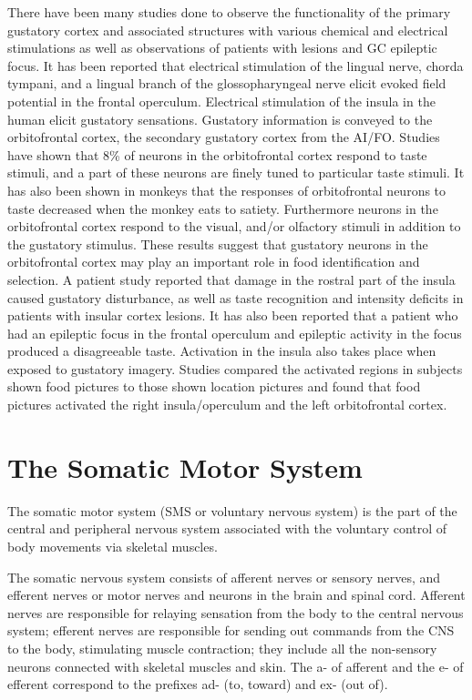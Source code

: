\documentclass[]{book}
\begin{document}
There have been many studies done to observe the functionality of the primary gustatory cortex and associated structures with various chemical and electrical stimulations as well as observations of patients with lesions and GC epileptic focus. It has been reported that electrical stimulation of the lingual nerve, chorda tympani, and a lingual branch of the glossopharyngeal nerve elicit evoked field potential in the frontal operculum. Electrical stimulation of the insula in the human elicit gustatory sensations. Gustatory information is conveyed to the orbitofrontal cortex, the secondary gustatory cortex from the AI/FO. Studies have shown that 8\% of neurons in the orbitofrontal cortex respond to taste stimuli, and a part of these neurons are finely tuned to particular taste stimuli. It has also been shown in monkeys that the responses of orbitofrontal neurons to taste decreased when the monkey eats to satiety. Furthermore neurons in the orbitofrontal cortex respond to the visual, and/or olfactory stimuli in addition to the gustatory stimulus. These results suggest that gustatory neurons in the orbitofrontal cortex may play an important role in food identification and selection. A patient study reported that damage in the rostral part of the insula caused gustatory disturbance, as well as taste recognition and intensity deficits in patients with insular cortex lesions. It has also been reported that a patient who had an epileptic focus in the frontal operculum and epileptic activity in the focus produced a disagreeable taste. Activation in the insula also takes place when exposed to gustatory imagery. Studies compared the activated regions in subjects shown food pictures to those shown location pictures and found that food pictures activated the right insula/operculum and the left orbitofrontal cortex.

\hypertarget{the-somatic-motor-system}{%
\chapter{The Somatic Motor System}\label{the-somatic-motor-system}}

The somatic motor system (SMS or voluntary nervous system) is the part of the central and peripheral nervous system associated with the voluntary control of body movements via skeletal muscles.

The somatic nervous system consists of afferent nerves or sensory nerves, and efferent nerves or motor nerves and neurons in the brain and spinal cord. Afferent nerves are responsible for relaying sensation from the body to the central nervous system; efferent nerves are responsible for sending out commands from the CNS to the body, stimulating muscle contraction; they include all the non-sensory neurons connected with skeletal muscles and skin. The a- of afferent and the e- of efferent correspond to the prefixes ad- (to, toward) and ex- (out of).
\end{document}
